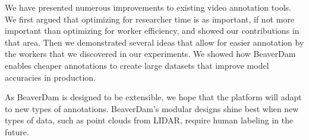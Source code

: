 We have presented numerous improvements to existing video annotation tools.
We first argued that optimizing for researcher time is as important, if not more important than optimizing for worker efficiency, and showed our contributions in that area.
Then we demonstrated several ideas that allow for easier annotation by the workers that we discovered in our experiments.
We showed how BeaverDam enables cheaper annotations to create large datasets that improve model accuracies in production. %

As BeaverDam is designed to be extensible, we hope that the platform will adapt to new types of annotations.
BeaverDam's modular designs shine best when new types of data, such as point clouds from LIDAR, require human labeling in the future.


